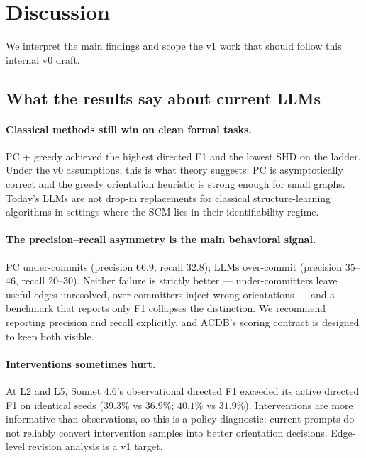 \section{Discussion}
\label{sec:discussion}

We interpret the main findings and scope the v1 work that should follow this internal v0 draft.

\subsection{What the results say about current LLMs}

\paragraph{Classical methods still win on clean formal tasks.} PC + greedy achieved the highest directed F1 and the lowest SHD on the ladder. Under the v0 assumptions, this is what theory suggests: PC is asymptotically correct and the greedy orientation heuristic is strong enough for small graphs. Today's LLMs are not drop-in replacements for classical structure-learning algorithms in settings where the SCM lies in their identifiability regime.

\paragraph{The precision--recall asymmetry is the main behavioral signal.} PC under-commits (precision $66.9$, recall $32.8$); LLMs over-commit (precision $35$--$46$, recall $20$--$30$). Neither failure is strictly better --- under-committers leave useful edges unresolved, over-committers inject wrong orientations --- and a benchmark that reports only F1 collapses the distinction. We recommend reporting precision and recall explicitly, and ACDB's scoring contract is designed to keep both visible.

\paragraph{Interventions sometimes hurt.} At L2 and L5, Sonnet 4.6's observational directed F1 exceeded its active directed F1 on identical seeds ($39.3\%$ vs $36.9\%$; $40.1\%$ vs $31.9\%$). Interventions are more informative than observations, so this is a policy diagnostic: current prompts do not reliably convert intervention samples into better orientation decisions. Edge-level revision analysis is a v1 target.

